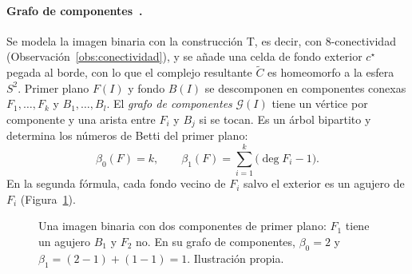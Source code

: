 \paragraph{Grafo de componentes~\cite[§2.1]{lux2025}.}  Se modela la imagen binaria con la construcción T, es decir, con
  8-conectividad (Observación~\ref{obs:conectividad}), y se añade una celda de fondo exterior
$c^\star$ pegada al borde, con lo que el complejo resultante $\tilde{C}$ es
homeomorfo a la esfera $S^2$. Primer plano $F(I)$ y fondo $B(I)$ se
descomponen en componentes conexas $F_1,\dots,F_k$ y $B_1,\dots,B_l$. El
\emph{grafo de componentes} $\mathcal{G}(I)$ tiene un vértice por
componente y una arista entre $F_i$ y $B_j$ si se tocan. Es un árbol
bipartito y determina los números de Betti del primer plano:
\[
  \beta_0(F)=k,\qquad
  \beta_1(F)=\sum_{i=1}^{k}\bigl(\deg F_i-1\bigr).
\]
En la segunda fórmula, cada fondo vecino de $F_i$ salvo el exterior es un
agujero de $F_i$ (Figura~\ref{fig:grafo-componentes}).

\begin{figure}[ht]
\centering
{}
\caption{Una imagen binaria con dos componentes de primer plano: $F_1$
tiene un agujero $B_1$ y $F_2$ no. En su grafo de componentes,
$\beta_0=2$ y $\beta_1=(2-1)+(1-1)=1$. Ilustración propia.}
\label{fig:grafo-componentes}
\end{figure}

